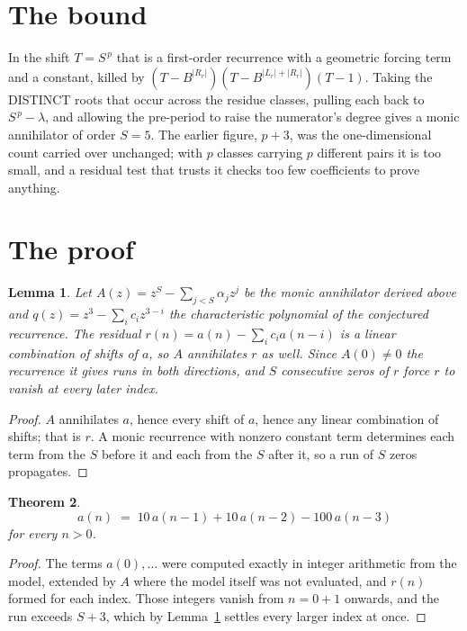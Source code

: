 \documentclass[11pt,a4paper]{article}
\theoremstyle{plain}
\newtheorem{theorem}{Theorem}
\newtheorem{lemma}[theorem]{Lemma}
\theoremstyle{definition}
\begin{document}
\section{The bound}

In the shift $T=S^{\,p}$ that is a first-order recurrence with a geometric forcing term and a
constant, killed by $(T-B^{|R_r|})(T-B^{|L_r|+|R_r|})(T-1)$. Taking the DISTINCT roots that
occur across the residue classes, pulling each back to $S^{\,p}-\lambda$, and allowing the
pre-period to raise the numerator's degree gives a monic annihilator of order $S=5$. The
earlier figure, $p+3$, was the one-dimensional count carried over unchanged; with $p$ classes
carrying $p$ different pairs it is too small, and a residual test that trusts it checks too few
coefficients to prove anything.

\section{The proof}

\begin{lemma}\label{lem:crit}
Let $A(z)=z^S-\sum_{j<S}\alpha_jz^{j}$ be the monic annihilator derived above and
$q(z)=z^{3}-\sum_ic_iz^{3-i}$ the characteristic polynomial of the conjectured
recurrence. The residual $r(n)=a(n)-\sum_ic_ia(n-i)$ is a linear combination of shifts of $a$,
so $A$ annihilates $r$ as well. Since $A(0)\ne0$ the recurrence it gives runs in both
directions, and $S$ consecutive zeros of $r$ force $r$ to vanish at every later index.
\end{lemma}

\begin{proof}
$A$ annihilates $a$, hence every shift of $a$, hence any linear combination of shifts; that is
$r$. A monic recurrence with nonzero constant term determines each term from the $S$ before it
and each from the $S$ after it, so a run of $S$ zeros propagates.
\end{proof}

\begin{theorem}
\[
a(n)\;=\;10\,a(n-1) + 10\,a(n-2) - 100\,a(n-3)
\]
for every $n>0$.
\end{theorem}

\begin{proof}
The terms $a(0),\dots$ were computed exactly in integer arithmetic from the model, extended by
$A$ where the model itself was not evaluated, and $r(n)$ formed for each index. Those integers
vanish from $n=0+1$ onwards, and the run exceeds $S+3$, which by
Lemma~\ref{lem:crit} settles every larger index at once.
\end{proof}
\end{document}
